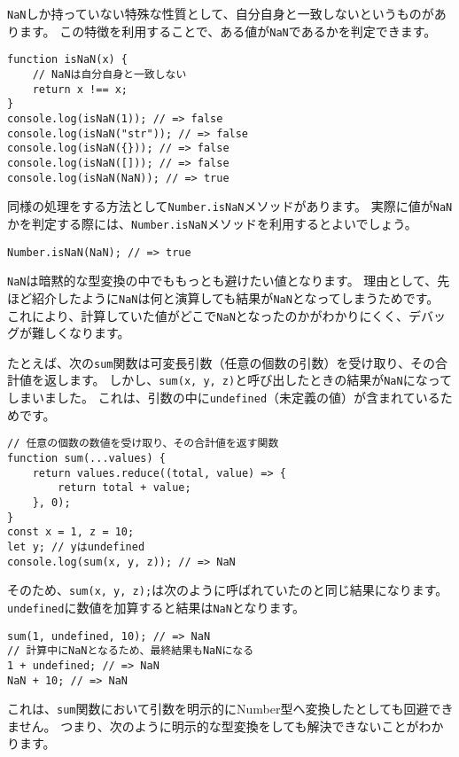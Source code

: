 \texttt{NaN}しか持っていない特殊な性質として、自分自身と一致しないというものがあります。
この特徴を利用することで、ある値が\texttt{NaN}であるかを判定できます。

\begin{lstlisting}
function isNaN(x) {
    // NaNは自分自身と一致しない
    return x !== x;
}
console.log(isNaN(1)); // => false
console.log(isNaN("str")); // => false
console.log(isNaN({})); // => false
console.log(isNaN([])); // => false
console.log(isNaN(NaN)); // => true
\end{lstlisting}

同様の処理をする方法として\texttt{Number.isNaN}メソッドがあります。
実際に値が\texttt{NaN}かを判定する際には、\texttt{Number.isNaN}メソッドを利用するとよいでしょう。

\begin{lstlisting}
Number.isNaN(NaN); // => true
\end{lstlisting}

\texttt{NaN}は暗黙的な型変換の中でももっとも避けたい値となります。
理由として、先ほど紹介したように\texttt{NaN}は何と演算しても結果が\texttt{NaN}となってしまうためです。
これにより、計算していた値がどこで\texttt{NaN}となったのかがわかりにくく、デバッグが難しくなります。

たとえば、次の\texttt{sum}関数は可変長引数（任意の個数の引数）を受け取り、その合計値を返します。
しかし、\texttt{sum(x, y, z)}と呼び出したときの結果が\texttt{NaN}になってしまいました。
これは、引数の中に\texttt{undefined}（未定義の値）が含まれているためです。

\begin{lstlisting}
// 任意の個数の数値を受け取り、その合計値を返す関数
function sum(...values) {
    return values.reduce((total, value) => {
        return total + value;
    }, 0);
}
const x = 1, z = 10;
let y; // yはundefined
console.log(sum(x, y, z)); // => NaN
\end{lstlisting}

そのため、\texttt{sum(x, y, z);}は次のように呼ばれていたのと同じ結果になります。
\texttt{undefined}に数値を加算すると結果は\texttt{NaN}となります。

\begin{lstlisting}
sum(1, undefined, 10); // => NaN
// 計算中にNaNとなるため、最終結果もNaNになる
1 + undefined; // => NaN
NaN + 10; // => NaN
\end{lstlisting}

これは、\texttt{sum}関数において引数を明示的にNumber型へ変換したとしても回避できません。
つまり、次のように明示的な型変換をしても解決できないことがわかります。

